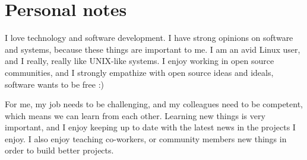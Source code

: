 \documentclass{twocolcv}
\begin{document}
\section*{Personal notes}
I love technology and software development. I have strong opinions on software and systems, because these things are important to me. I am an avid Linux user, and I really, really like UNIX-like systems. I enjoy working in open source communities, and I strongly empathize with open source ideas and ideals, software wants to be free :)

For me, my job needs to be challenging, and my colleagues need to be competent, which means we can learn from each other. Learning new things is very important, and I enjoy keeping up to date with the latest news in the projects I enjoy. I also enjoy teaching co-workers, or community members new things in order to build better projects.
\end{document}
